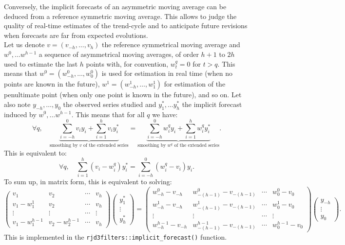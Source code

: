 \documentclass[
]{article}
\newcommand\1{\mathds{1}}
\begin{document}
Conversely, the implicit forecasts of an asymmetric moving average can
be deduced from a reference symmetric moving average. This allows to
judge the quality of real-time estimates of the trend-cycle and to
anticipate future revisions when forecasts are far from expected
evolutions.\\
Let us denote \(v=(v_{-h},\dots, v_{h})\) the reference symmetrical
moving average and \(w^0,\dots w^{h-1}\) a sequence of asymmetrical
moving averages, of order \(h+1\) to \(2h\) used to estimate the last
\(h\) points with, for convention, \(w_t^q=0\) for \(t>q\). This means
that \(w^0=(w_{-h}^0,\dots, w_{0}^0)\) is used for estimation in real
time (when no points are known in the future),
\(w^1=(w_{-h}^1,\dots, w_{1}^1)\) for estimation of the penultimate
point (when only one point is known in the future), and so on. Let also
note \(y_{-h},\dots,y_{0}\) the observed series studied and
\(y_{1}^*,\dots y_h^*\) the implicit forecast induced by
\(w^0,\dots w^{h-1}\). This means that for all \(q\) we have: \[
\forall q, \quad \underbrace{\sum_{i=-h}^0 v_iy_i + \sum_{i=1}^h v_iy_i^*}_{\text{smoothing by }v\text{ of the extended series}}
=\underbrace{\sum_{i=-h}^0 w_i^qy_i + \sum_{i=1}^h w_i^qy_i^*}_{\text{smoothing by }w^q\text{ of the extended series}}.
\] This is equivalent to: \[
\forall q, \quad \sum_{i=1}^h (v_i- w_i^q) y_i^*
=\sum_{i=-h}^0 (w_i^q-v_i)y_i.
\] To sum up, in matrix form, this is equivalent to solving: \[
\scriptstyle
\begin{pmatrix}
  v_1 & v_2 & \cdots & v_h \\
  v_1 - w_1^1 & v_2 & \cdots & v_h \\
  \vdots & \vdots & \cdots & \vdots \\
   v_1 - w_1^{h-1} & v_2-w_2^{h-1} & \cdots & v_h
\end{pmatrix}
\begin{pmatrix}y_1^* \\ \vdots \\ y_h^*\end{pmatrix}=
\begin{pmatrix}
  w_{-h}^0 - v_{-h} & w_{-(h-1)}^0 - v_{-(h-1)} & \cdots & w_{0}^0 - v_{0} \\
  w_{-h}^1 - v_{-h} & w_{-(h-1)}^1 - v_{-(h-1)} & \cdots & w_{0}^1 - v_{0} \\
  \vdots & \vdots & \cdots & \vdots \\
  w_{-h}^{h-1} - v_{-h} & w_{-(h-1)}^{h-1} - v_{-(h-1)} & \cdots & w_{0}^{h-1} - v_{0}
\end{pmatrix}
\begin{pmatrix}y_{-h} \\ \vdots \\ y_0\end{pmatrix}.
\] This is implemented in the \texttt{rjd3filters::implicit\_forecast()}
function.
\end{document}
